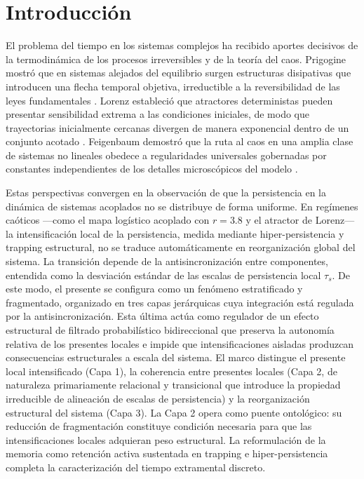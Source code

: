 \section{Introducción}

El problema del tiempo en los sistemas complejos ha recibido aportes decisivos de la termodinámica de los procesos irreversibles y de la teoría del caos. Prigogine mostró que en sistemas alejados del equilibrio surgen estructuras disipativas que introducen una flecha temporal objetiva, irreductible a la reversibilidad de las leyes fundamentales \citep{prigogine_being_to_becoming_1980,prigogine_stengers_order_out_chaos}. Lorenz estableció que atractores deterministas pueden presentar sensibilidad extrema a las condiciones iniciales, de modo que trayectorias inicialmente cercanas divergen de manera exponencial dentro de un conjunto acotado \citep{lorenz_deterministic_nonperiodic_1963}. Feigenbaum demostró que la ruta al caos en una amplia clase de sistemas no lineales obedece a regularidades universales gobernadas por constantes independientes de los detalles microscópicos del modelo \citep{feigenbaum_quantitative_universality_1978}.

Estas perspectivas convergen en la observación de que la persistencia en la dinámica de sistemas acoplados no se distribuye de forma uniforme. En regímenes caóticos —como el mapa logístico acoplado con $r=3.8$ y el atractor de Lorenz— la intensificación local de la persistencia, medida mediante hiper-persistencia y trapping estructural, no se traduce automáticamente en reorganización global del sistema. La transición depende de la antisincronización entre componentes, entendida como la desviación estándar de las escalas de persistencia local $\tau_s$. De este modo, el presente se configura como un fenómeno estratificado y fragmentado, organizado en tres capas jerárquicas cuya integración está regulada por la antisincronización. Esta última actúa como regulador de un efecto estructural de filtrado probabilístico bidireccional que preserva la autonomía relativa de los presentes locales e impide que intensificaciones aisladas produzcan consecuencias estructurales a escala del sistema. El marco distingue el presente local intensificado (Capa 1), la coherencia entre presentes locales (Capa 2, de naturaleza primariamente relacional y transicional que introduce la propiedad irreducible de alineación de escalas de persistencia) y la reorganización estructural del sistema (Capa 3). La Capa 2 opera como puente ontológico: su reducción de fragmentación constituye condición necesaria para que las intensificaciones locales adquieran peso estructural. La reformulación de la memoria como retención activa sustentada en trapping e hiper-persistencia completa la caracterización del tiempo extramental discreto.